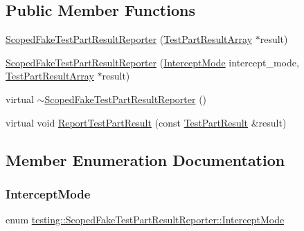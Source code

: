 \subsection*{Public Member Functions}
\begin{DoxyCompactItemize}
\item 
\mbox{\hyperlink{classtesting_1_1_scoped_fake_test_part_result_reporter_aa0100ecf4799fb51d45167be6a5de1d5}{Scoped\+Fake\+Test\+Part\+Result\+Reporter}} (\mbox{\hyperlink{classtesting_1_1_test_part_result_array}{Test\+Part\+Result\+Array}} $\ast$result)
\item 
\mbox{\hyperlink{classtesting_1_1_scoped_fake_test_part_result_reporter_a57cbc09ed48627c8a73e622618dc4b4f}{Scoped\+Fake\+Test\+Part\+Result\+Reporter}} (\mbox{\hyperlink{classtesting_1_1_scoped_fake_test_part_result_reporter_a82f6209b3cf5c4b15ec8bd8041dbc2d5}{Intercept\+Mode}} intercept\+\_\+mode, \mbox{\hyperlink{classtesting_1_1_test_part_result_array}{Test\+Part\+Result\+Array}} $\ast$result)
\item 
virtual \mbox{\hyperlink{classtesting_1_1_scoped_fake_test_part_result_reporter_a916585996236c45e447546a3bcc0796c}{$\sim$\+Scoped\+Fake\+Test\+Part\+Result\+Reporter}} ()
\item 
virtual void \mbox{\hyperlink{classtesting_1_1_scoped_fake_test_part_result_reporter_a3bc6cb939cbc3db71ece8846e6bafe00}{Report\+Test\+Part\+Result}} (const \mbox{\hyperlink{classtesting_1_1_test_part_result}{Test\+Part\+Result}} \&result)
\end{DoxyCompactItemize}


\subsection{Member Enumeration Documentation}
\mbox{\label{classtesting_1_1_scoped_fake_test_part_result_reporter_a82f6209b3cf5c4b15ec8bd8041dbc2d5}} 
\subsubsection{\texorpdfstring{InterceptMode}{InterceptMode}}
{\footnotesize\ttfamily enum \mbox{\hyperlink{classtesting_1_1_scoped_fake_test_part_result_reporter_a82f6209b3cf5c4b15ec8bd8041dbc2d5}{testing\+::\+Scoped\+Fake\+Test\+Part\+Result\+Reporter\+::\+Intercept\+Mode}}}

